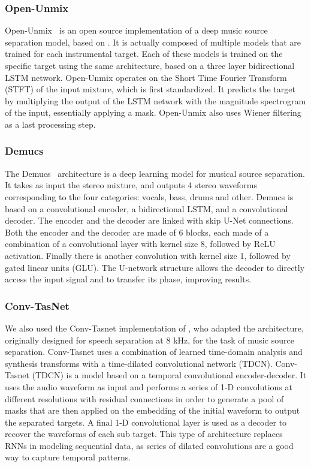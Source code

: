 \documentclass{article}
\begin{document}
			\subsubsection{Open-Unmix}
			Open-Unmix~\cite{open-unmix} is an open source implementation of a deep music source separation model, based on \cite{Uhlich2017}. It is actually composed of multiple models that are trained for each instrumental target. Each of these models is trained on the specific target using the same architecture, based on a three layer bidirectional LSTM network. Open-Unmix operates on the Short Time Fourier Transform (STFT) of the input mixture, which is first standardized. It predicts the target by multiplying the output of the LSTM network with the magnitude spectrogram of the input, essentially applying a mask. Open-Unmix also uses Wiener filtering as a last processing step.
			
			\subsubsection{Demucs}
			The Demucs~\cite{demucs} architecture is a deep learning model for musical source separation. It takes as input the stereo mixture, and outputs 4 stereo waveforms corresponding to the four categories: vocals, bass, drums and other. Demucs is based on a convolutional encoder, a bidirectional LSTM, and a convolutional decoder. The encoder and the decoder are linked with skip U-Net connections. Both the encoder and the decoder are made of 6 blocks, each made of a combination of a convolutional layer with kernel size 8, followed by ReLU activation. Finally there is another convolution with kernel size 1, followed by gated linear units (GLU). The U-network structure allows the decoder to directly access the input signal and to transfer its phase, improving results.	
			
			\subsubsection{Conv-TasNet}
			We also used the Conv-Tasnet\cite{tdcn} implementation of \cite{demucs}, who adapted the architecture, originally designed for speech separation at 8 kHz, for the task of music source separation. Conv-Tasnet uses  a combination of learned time-domain analysis and synthesis transforms with a time-dilated convolutional network (TDCN).
			Conv-Tasnet (TDCN) is a model based on a temporal convolutional encoder-decoder. It uses the audio waveform as input and performs a series of 1-D convolutions at different resolutions with residual connections in order to generate a pool of masks that are then applied on the embedding of the initial waveform to output the separated targets. A final 1-D convolutional layer is used as a decoder to recover the waveforms of each sub target. This type of architecture replaces RNNs in modeling sequential data, as series of dilated convolutions are a good way to capture temporal patterns.		
			
\end{document}
